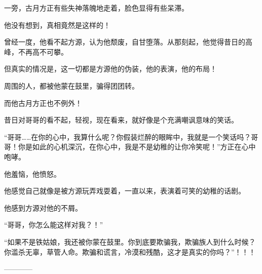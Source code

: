 \begin{this_body}
一旁，古月方正有些失神落魄地走着，脸色显得有些呆滞。

他没有想到，真相竟然是这样的！

曾经一度，他看不起方源，认为他颓废，自甘堕落。从那刻起，他觉得昔日的高峰，不再高不可攀。

但真实的情况是，这一切都是方源他的伪装，他的表演，他的布局！

周围的人，都被他蒙在鼓里，骗得团团转。

而他古月方正也不例外！

昔日对哥哥的看不起，轻视，现在看来，就好像是个充满嘲讽意味的笑话。

“哥哥……在你的心中，我算什么呢？你假装烂醉的眼眸中，我就是一个笑话吗？哥哥！你是如此的心机深沉，在你心中，我是不是幼稚的让你冷笑呢！”方正在心中咆哮。

他羞恼，他愤怒。

他感觉自己就像是被方源玩弄戏耍着，一直以来，表演着可笑的幼稚的话剧。

他感到方源对他的不屑。

“哥哥，你怎么能这样对我？！”

“如果不是铁姑娘，我还被你蒙在鼓里。你到底要欺骗我，欺骗族人到什么时候？你滥杀无辜，草管人命。欺骗和谎言，冷漠和残酷，这才是真实的你吗？”！！！

------------

\end{this_body}

